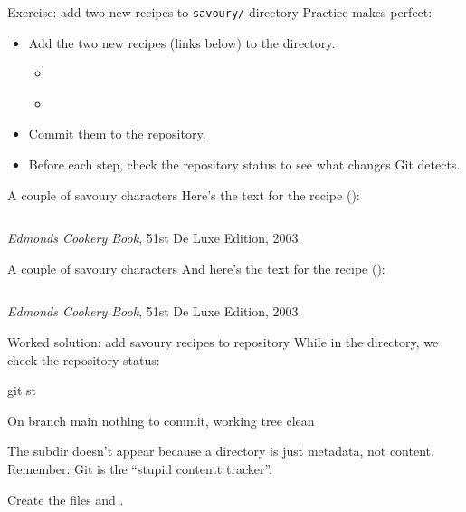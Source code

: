 \begin{frame}[fragile]{Exercise: add two new recipes to \texttt{savoury/} directory}
    Practice makes perfect:
    \begin{itemize}
        \item Add the two new recipes (links below) to the  directory.
            \begin{itemize}
                \item \href{https://raw.githubusercontent.com/paultcochrane/git_course/refs/heads/master/git/examples/cheese-scones.md}{}
                \item \href{https://raw.githubusercontent.com/paultcochrane/git_course/refs/heads/master/git/examples/bacon-and-egg-pie.md}{}
            \end{itemize}
        \item Commit them to the repository.
        \item Before each step, check the repository status to see what
            changes Git detects.
    \end{itemize}
\end{frame}

\begin{frame}[fragile]{A couple of savoury characters}
    Here's the text for the  recipe
    (\href{https://raw.githubusercontent.com/paultcochrane/git_course/refs/heads/master/git/examples/cheese-scones.md}{}):

    \inputminted[fontsize=\tiny]{markdown}{examples/cheese-scones.md}
    {\footnotesize \emph{Edmonds Cookery Book}, 51st De Luxe Edition, 2003.}
\end{frame}

\begin{frame}[fragile]{A couple of savoury characters}
    And here's the text for the  recipe
    (\href{https://raw.githubusercontent.com/paultcochrane/git_course/refs/heads/master/git/examples/bacon-and-egg-pie.md}{}):

    \inputminted[fontsize=\tiny]{markdown}{examples/bacon-and-egg-pie.md}
    {\footnotesize \emph{Edmonds Cookery Book}, 51st De Luxe Edition, 2003.}
\end{frame}

\begin{frame}[fragile]{Worked solution: add savoury recipes to repository}
    While in the  directory, we check the repository status:
    \begin{shellcode}
        git st
    \end{shellcode}
    \begin{outputcode}
On branch main
nothing to commit, working tree clean
    \end{outputcode}
    The  subdir doesn't appear because a directory is just
    metadata, not content.  Remember: Git is the ``stupid contentt tracker''.

    Create the files  and
    .
\end{frame}

